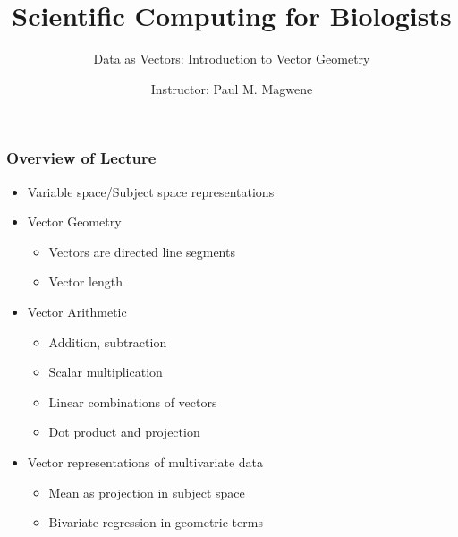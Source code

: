 \documentclass{beamer}
\title{Scientific Computing for Biologists}
\subtitle{Data as Vectors: Introduction to Vector Geometry} %
\date{}
\author[P. Magwene]{Instructor: Paul M. Magwene}
\begin{document}
\begin{frame}
\titlepage
\end{frame}

\begin{frame}
  \frametitle{Overview of Lecture}

\begin{itemize}
        \item Variable space/Subject space representations
		\item Vector Geometry
		\begin{itemize}
			\item Vectors are directed line segments
			\item Vector length
		\end{itemize}
		\item Vector Arithmetic
		\begin{itemize}
			\item Addition, subtraction
			\item Scalar multiplication
			\item Linear combinations of vectors
			\item Dot product and projection
		\end{itemize}
		\item Vector representations of multivariate data
        \begin{itemize}
			\item Mean as projection in subject space
			\item Bivariate regression in geometric terms
		\end{itemize}
\end{itemize}

\end{frame}

\end{document}
